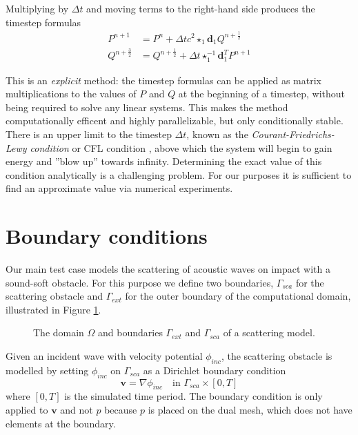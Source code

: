 \documentclass[utf8,english]{gradu3}
\begin{document}
Multiplying by $\Delta t$ and moving terms to the right-hand side
produces the timestep formulas
\begin{align}
  \label{eq:timestep_p}
  P^{n+1} &= P^n + \Delta t c^2 \star_1 \mathbf{d}_1 Q^{n+\frac{1}{2}} \\
  \label{eq:timestep_q}
  Q^{n+\frac{3}{2}} &= Q^{n+\frac{1}{2}} + \Delta t \star_1^{-1} \mathbf{d}_1^T P^{n+1}
\end{align}

This is an \textit{explicit} method:
the timestep formulas can be applied as matrix multiplications
to the values of $P$ and $Q$ at the beginning of a timestep,
without being required to solve any linear systems.
This makes the method computationally efficent and highly parallelizable,
but only conditionally stable.
There is an upper limit to the timestep $\Delta t$,
known as the \textit{Courant-Friedrichs-Lewy condition}
or CFL condition \parencite{courant_partial_1967},
above which the system will begin to gain energy and ''blow up'' towards infinity.
Determining the exact value of this condition analytically is a challenging problem.
For our purposes it is sufficient to find an approximate value 
via numerical experiments.


\section{Boundary conditions}\label{sec:boundary_conditions}

Our main test case models the scattering of acoustic waves
on impact with a sound-soft obstacle.
For this purpose we define two boundaries,
$\Gamma_{sca}$ for the scattering obstacle
and $\Gamma_{ext}$ for the outer boundary of the computational domain,
illustrated in Figure \ref{fig:scatterer_domain}.

\begin{figure}[h]
  \centering
  \caption{The domain $\Omega$ and boundaries $\Gamma_{ext}$ and $\Gamma_{sca}$
    of a scattering model.}
  \label{fig:scatterer_domain}
\end{figure}

Given an incident wave with velocity potential $\phi_{inc}$,
the scattering obstacle is modelled by setting $\phi_{inc}$ on $\Gamma_{sca}$
as a Dirichlet boundary condition
\begin{equation}
  \mathbf{v} = \nabla \phi_{inc}
  \quad \text{in } \Gamma_{sca} \times [0, T]
\end{equation}
where $[0,T]$ is the simulated time period.
The boundary condition is only applied to $\mathbf{v}$
and not $p$ because $p$ is placed on the dual mesh,
which does not have elements at the boundary.
\end{document}
